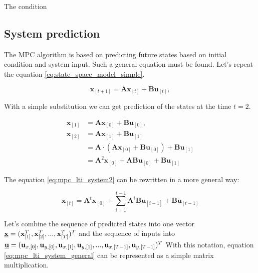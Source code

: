 \documentclass{article}
\begin{document}
The condition 

\subsubsection{}

\subsection{System prediction}
The MPC algorithm is based on predicting future states based on initial condition and system input. Such a general equation must be found. Let's repeat the equation \ref{eq:state_space_model_simple}.

\begin{equation}
\textbf{x}_{[t+1]} = \textbf{A}\textbf{x}_{[t]} + \textbf{B}\textbf{u}_{[t]},
\label{eq:mpc_lti_system}
\end{equation}

With a simple substitution we can get prediction of the states at the time $t = 2$.

\begin{equation}
\begin{split}
\label{eq:mpc_lti_system2}
\textbf{x}_{[1]} &= \textbf{A}\textbf{x}_{[0]} + \textbf{B}\textbf{u}_{[0]},\\
\textbf{x}_{[2]} &= \textbf{A}\textbf{x}_{[1]} + \textbf{B}\textbf{u}_{[1]}\\
&= \textbf{A}\cdot(\textbf{A}\textbf{x}_{[0]} + \textbf{B}\textbf{u}_{[0]}) + \textbf{B}\textbf{u}_{[1]} \\
&=\textbf{A}^2\textbf{x}_{[0]} + \textbf{A}\textbf{B}\textbf{u}_{[0]} + \textbf{B} \textbf{u}_{[1]}
\end{split}
\end{equation}

The equation \ref{eq:mpc_lti_system2} can be rewritten in a more general way:

\begin{equation}
\label{eq:mpc_lti_system_general}
\textbf{x}_{[t]} =\textbf{A}^t\textbf{x}_{[0]} + 
\sum_{i = 1}^{t-1}\textbf{A}^{i}\textbf{B}\textbf{u}_{[i-1]} + \textbf{B} \textbf{u}_{[t-1]}
\end{equation}

Let's combine the sequence of predicted states into one vector $\textbf{\underline{x}} = (\textbf{x}_{[1]}^T, \textbf{x}_{[2]}^T, ..., \textbf{x}_{[T]}^T)^T$ and the sequence of inputs into 
$\textbf{\underline{u}} = (\textbf{u}_{x,[0]}, \textbf{u}_{y,[0]}, \textbf{u}_{x,[1]}, \textbf{u}_{y,[1]}, ..., \textbf{u}_{x,[T-1]}, \textbf{u}_{y,[T-1]})^T$
With this notation, equation \ref{eq:mpc_lti_system_general} can be represented as a simple matrix multiplication.
\end{document}
